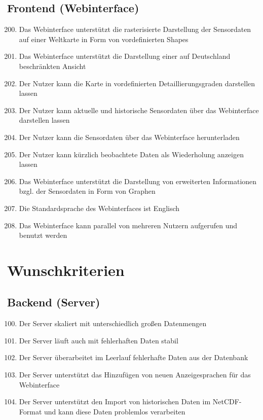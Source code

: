 \subsection{Frontend (Webinterface)}
\begin{enumerate}[label=\textbf{MK\arabic{enumi}0}]
	\setcounter{enumi}{199}
	\item Das Webinterface unterstützt die rasterisierte Darstellung der Sensordaten auf einer Weltkarte in Form von vordefinierten Shapes
	\item Das Webinterface unterstützt die Darstellung einer auf Deutschland beschränkten Ansicht\item Der Nutzer kann die Karte in vordefinierten Detaillierungsgraden darstellen lassen
	\item Der Nutzer kann aktuelle und historische Sensordaten über das Webinterface darstellen lassen
	\item Der Nutzer kann die Sensordaten über das Webinterface herunterladen
	\item Der Nutzer kann kürzlich beobachtete Daten als Wiederholung anzeigen lassen
	\item Das Webinterface unterstützt die Darstellung von erweiterten Informationen bzgl. der Sensordaten in Form von Graphen
	\item Die Standardsprache des Webinterfaces ist Englisch
	\item Das Webinterface kann parallel von mehreren Nutzern aufgerufen und benutzt werden
\end{enumerate}

\section{Wunschkriterien}
\subsection{Backend (Server)}
\begin{enumerate}[label=\textbf{WK\arabic{enumi}0}]
	\setcounter{enumi}{99}
	\item Der Server skaliert mit unterschiedlich großen Datenmengen
	\item Der Server läuft auch mit fehlerhaften Daten stabil
	\item Der Server überarbeitet im Leerlauf fehlerhafte Daten aus der Datenbank
	\item Der Server unterstützt das Hinzufügen von neuen Anzeigesprachen für das Webinterface
	\item \label{NetCDF_Import}Der Server unterstützt den Import von historischen Daten im NetCDF-Format und kann diese Daten problemlos verarbeiten
\end{enumerate}
